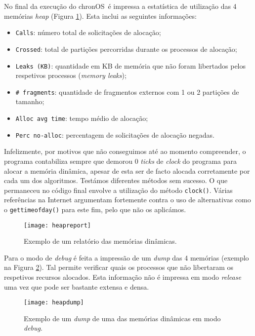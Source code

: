 \documentclass[10pt,oneside]{estiloUBI}
\newcommand{\chronOS}{\textsf{chronOS}}
\begin{document}
	No final da execução do \chronOS~é impressa a estatística de utilização das 4 memórias \textit{heap} (Figura \ref{fig:heapreport}). Esta inclui as seguintes informações:
	
	\begin{itemize}
		\item \verb|Calls|: número total de solicitações de alocação;
		\item \verb|Crossed|: total de partições percorridas durante os processos de alocação;
		\item \verb|Leaks (KB)|: quantidade em KB de memória que não foram libertados pelos respetivos processos (\textit{memory leaks});
		\item \verb|# fragments|: quantidade de fragmentos externos com 1 ou 2 partições de tamanho;
		\item \verb|Alloc avg time|: tempo médio de alocação;
		\item \verb|Perc no-alloc|: percentagem de solicitações de alocação negadas.
	\end{itemize}
	
	Infelizmente, por motivos que não conseguimos até ao momento compreender, o programa contabiliza sempre que demorou 0 \textit{ticks} de \textit{clock} do programa para alocar a memória dinâmica, apesar de esta ser de facto alocada corretamente por cada um dos algoritmos. Testámos diferentes métodos sem sucesso. O que permaneceu no código final envolve a utilização do método \verb|clock()|. Várias referências na Internet argumentam fortemente contra o uso de alternativas como o \verb|gettimeofday()| para este fim, pelo que não os aplicámos.
	
	\begin{figure}[!htbp]
		\centering
		\texttt{[image: heapreport]}
		\caption{Exemplo de um relatório das memórias dinâmicas.}
		\label{fig:heapreport}
	\end{figure}

	Para o modo de \textit{debug} é feita a impressão de um \textit{dump} das 4 memórias (exemplo na Figura \ref{fig:heapdump}). Tal permite verificar quais os processos que não libertaram os respetivos recursos alocados. Esta informação não é impressa em modo \textit{release} uma vez que pode ser bastante extensa e densa.
	
	\begin{figure}[!htbp]
		\centering
		\texttt{[image: heapdump]}
		\caption{Exemplo de um \textit{dump} de uma das memórias dinâmicas em modo \textit{debug}.}
		\label{fig:heapdump}
	\end{figure}
\end{document}
